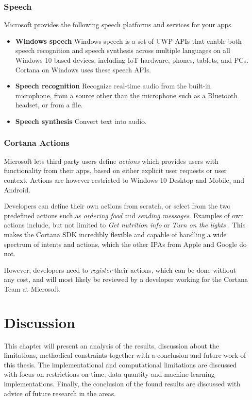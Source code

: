 \documentclass[preprint,12pt]{elsarticle}
\begin{document}
\subsubsection{Speech}
Microsoft provides the following speech platforms and services for your apps.

\begin{itemize}
    \item \textbf{Windows speech}
Windows speech is a set of UWP APIs that enable both speech recognition and speech synthesis across multiple languages on all Windows-10 based devices, including IoT hardware, phones, tablets, and PCs. Cortana on Windows uses these speech APIs.
    \item \textbf{Speech recognition}
Recognize real-time audio from the built-in microphone, from a source other than the microphone such as a Bluetooth headset, or from a file.
    \item \textbf{Speech synthesis}
Convert text into audio.
\end{itemize}





\subsubsection{Cortana Actions}
Microsoft lets third party users define \textit{actions} which provides users with functionality from their apps, based on either explicit user requests or user context. Actions are however restricted to Windows 10 Desktop and Mobile, and Android.

Developers can define their own actions from scratch, or select from the two predefined actions such as \textit{ordering food} and \textit{sending messages}. Examples of own actions include, but not limited to \textit{Get nutrition info} or \textit{Turn on the lights} \cite{cortanactions2016}. This makes the Cortana SDK incredibly flexible and capable of handling a wide spectrum of intents and actions, which the other IPAs from Apple and Google do not.

However, developers need to \textit{register} their actions, which can be done without any cost, and will most likely be reviewed by a developer working for the Cortana Team at Microsoft. 

\section{Discussion}
This chapter will present an analysis of the results, discussion about the limitations, methodical constraints together with a conclusion and future work of this thesis. The implementational and computational limitations are discussed with focus on restrictions on time, data quantity and machine learning implementations. Finally, the conclusion of the found results are discussed with advice of future research in the areas.
\end{document}
